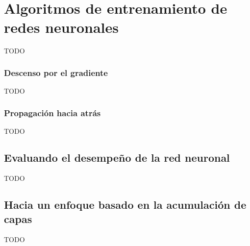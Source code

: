 \section{Algoritmos de entrenamiento de redes neuronales}

TODO

\subsubsection*{Descenso por el gradiente}

TODO

\subsubsection{Propagación hacia atrás}

TODO


\subsection{Evaluando el desempeño de la red neuronal}

TODO


\subsection{Hacia un enfoque basado en la acumulación de capas}

TODO
